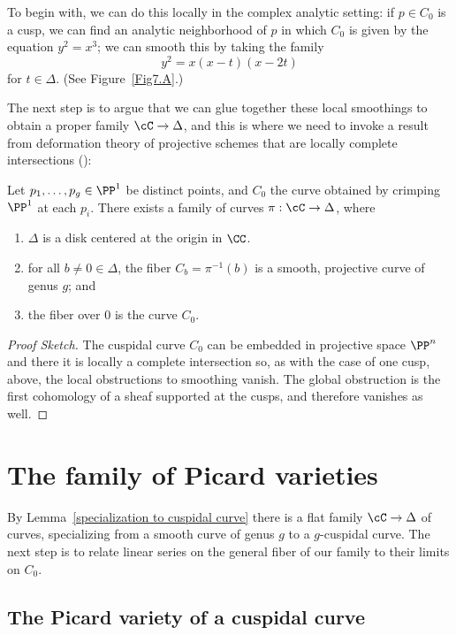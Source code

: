 To begin with, we can do this locally in the complex analytic setting: if $p \in C_0$ is a cusp, we can find an analytic neighborhood of $p$ in which $C_0$ is given by the equation $y^2 = x^3$; we can smooth this by taking the family
$$
y^2 = x(x-t)(x-2t)
$$
for $t\in \Delta$.
(See Figure~\ref{Fig7.A}.)

The next step is to argue that we can glue together these local smoothings to obtain a proper family $\cC \to \Delta$, and this is where we need to invoke a result from deformation theory of projective schemes that are locally complete 
intersections (\cite[Proposition 6.5.2]{MR2223408}):

\begin{lemma}\label{specialization to cuspidal curve}
Let $p_1,\dots,p_g \in \PP^1$ be distinct points, and $C_0$ the curve obtained by 
crimping $\PP^1$ at each $p_i$. There exists a family of curves $\pi : \cC \to \Delta$, where
\begin{enumerate}
\item $\Delta$ is a disk centered at the origin in $\CC$.
\item for all $b \neq 0 \in \Delta$, the fiber $C_b = \pi^{-1}(b)$ is a smooth, projective curve of genus $g$;  and
\item the fiber over $0$ is the curve $C_0$.
\end{enumerate}
\end{lemma}

\begin{proof}[Proof Sketch]
The cuspidal curve $C_{0}$ can be embedded in projective space $\PP^{n}$ and there
it is locally a complete intersection so, as with the case of one cusp, above, the local obstructions
to smoothing vanish. The global obstruction is the first cohomology of a sheaf supported at the cusps,
and therefore vanishes as well.
\end{proof}


\section{The family of Picard varieties}\label{Picard family}

By Lemma~\ref{specialization to cuspidal curve} there is a flat family $\cC \to \Delta$ of curves, specializing from a smooth curve of genus $g$ to a $g$-cuspidal curve. The next step is to relate linear series on the general fiber of our family to their limits on $C_0$.

\subsection{The Picard variety of a cuspidal curve}

